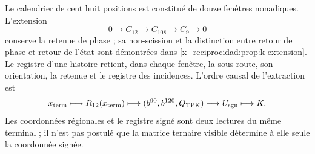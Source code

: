 Le calendrier de cent huit positions est constitué de douze fenêtres nonadiques.
L’extension
\[
 0\longrightarrow C_{12}\longrightarrow C_{108}
 \longrightarrow C_9\longrightarrow0
\]
conserve la retenue de phase ; sa non-scission et la distinction entre retour de
phase et retour de l’état sont démontrées dans
\cref{x_reciprocidad:prop:k-extension}. Le registre d’une histoire retient, dans chaque
fenêtre, la sous-route, son orientation, la retenue et le registre des incidences.
L’ordre causal de l’extraction est
\begin{equation}
 x_{\rm term}\longmapsto\mathcal R_{12}(x_{\rm term})
 \longmapsto(b^{90},b^{120},Q_{\rm TPK})
 \longmapsto U_{\rm sgn}\longmapsto K.
 \label{x_reciprocidad:lib01:cadena-registro}
\end{equation}
Les coordonnées régionales et le registre signé sont deux lectures du même terminal ; il n'est pas postulé que la matrice ternaire visible détermine à elle seule la coordonnée signée.

